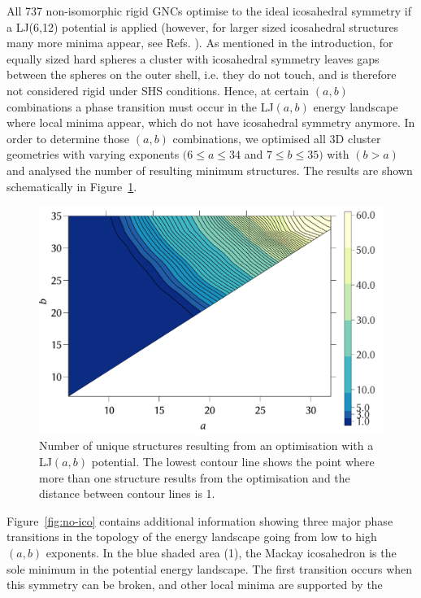 All 737 non-isomorphic rigid GNCs optimise to the ideal icosahedral symmetry if
a LJ(6,12) potential is applied
\autocite{Trombach_stickyhardsphereLennardJonestypeclusters_2018} (however, for
larger sized icosahedral structures many more minima appear, see Refs.
\cite{Doye-1995,Wales_TheoreticalPredictionsStructure_1996,Doye_effectrangepotential_1996,Doye_Structuralconsequencesrange_1997}).
As mentioned in the introduction, for equally sized hard spheres a cluster with
icosahedral symmetry leaves gaps between the spheres on the outer shell, i.e.
they do not touch, and is therefore not considered rigid under SHS conditions.
Hence, at certain $(a,b)$ combinations a phase transition must occur in the
LJ$(a,b)$ energy landscape where local minima appear, which do not have
icosahedral symmetry anymore. In order to determine those $(a,b)$ combinations,
we optimised all 3D cluster geometries with varying exponents $(6\leq a \leq
34$ and $7\leq b\leq 35)$ with $(b>a)$ and analysed the number of resulting
minimum structures. The results are shown schematically in
Figure~\ref{fig:ico-2d}.
%
\begin{figure}[htb]\centering
    \includegraphics[width=.8\columnwidth]{gregory-newton/ico-2d.pdf}
    \caption{Number of unique structures resulting from an optimisation with a
    LJ$(a,b)$ potential. The lowest contour line shows the point where more
    than one structure results from the optimisation and the distance between
    contour lines is 1.}
    \label{fig:ico-2d}
\end{figure}
%
Figure~\ref{fig:no-ico} contains additional information showing three major
phase transitions in the topology of the energy landscape going from low to
high $(a,b)$ exponents. In the blue shaded area (1), the Mackay icosahedron is
the sole minimum in the potential energy landscape. The first transition occurs
when this symmetry can be broken, and other local minima are supported by the
